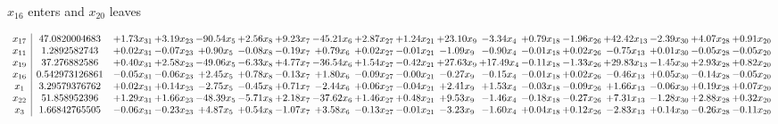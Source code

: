 \documentclass[9pt]{article}
\begin{document}
 $ x_{16} $ enters and $ x_{20} $ leaves 

 \[\begin{array}{c| c c@{\hskip 2pt} c@{\hskip 2pt} c@{\hskip 2pt} c@{\hskip 2pt} c@{\hskip 2pt} c@{\hskip 2pt} c@{\hskip 2pt} c@{\hskip 2pt} c@{\hskip 2pt} c@{\hskip 2pt} c@{\hskip 2pt} c@{\hskip 2pt} c@{\hskip 2pt} c@{\hskip 2pt} c@{\hskip 2pt} c@{\hskip 2pt} }
 x_{17}   &  47.0820004683 & +  1.73 x_{31} & +  3.19 x_{23} & -90.54 x_{5} & +  2.56 x_{8} & +  9.23 x_{7} & -45.21 x_{6} & +  2.87 x_{27} & +  1.24 x_{21} & + 23.10 x_{9} & -3.34 x_{4} & +  0.79 x_{18} & -1.96 x_{26} & + 42.42 x_{13} & -2.39 x_{30} & +  4.07 x_{28} & +  0.91 x_{20}\\
 x_{11}   &  1.2892582743 & +  0.02 x_{31} & -0.07 x_{23} & +  0.90 x_{5} & -0.08 x_{8} & -0.19 x_{7} & +  0.79 x_{6} & +  0.02 x_{27} & -0.01 x_{21} & -1.09 x_{9} & -0.90 x_{4} & -0.01 x_{18} & +  0.02 x_{26} & -0.75 x_{13} & +  0.01 x_{30} & -0.05 x_{28} & -0.05 x_{20}\\
 x_{19}   &  37.276882586 & +  0.40 x_{31} & +  2.58 x_{23} & -49.06 x_{5} & -6.33 x_{8} & +  4.77 x_{7} & -36.54 x_{6} & +  1.54 x_{27} & -0.42 x_{21} & + 27.63 x_{9} & + 17.49 x_{4} & -0.11 x_{18} & -1.33 x_{26} & + 29.83 x_{13} & -1.45 x_{30} & +  2.93 x_{28} & +  0.82 x_{20}\\
 x_{16}   &  0.542973126861 & -0.05 x_{31} & -0.06 x_{23} & +  2.45 x_{5} & +  0.78 x_{8} & -0.13 x_{7} & +  1.80 x_{6} & -0.09 x_{27} & -0.00 x_{21} & -0.27 x_{9} & -0.15 x_{4} & -0.01 x_{18} & +  0.02 x_{26} & -0.46 x_{13} & +  0.05 x_{30} & -0.14 x_{28} & -0.05 x_{20}\\
 x_{1}   &  3.29579376762 & +  0.02 x_{31} & +  0.14 x_{23} & -2.75 x_{5} & -0.45 x_{8} & +  0.71 x_{7} & -2.44 x_{6} & +  0.06 x_{27} & -0.04 x_{21} & +  2.41 x_{9} & +  1.53 x_{4} & -0.03 x_{18} & -0.09 x_{26} & +  1.66 x_{13} & -0.06 x_{30} & +  0.19 x_{28} & +  0.07 x_{20}\\
 x_{22}   &  51.858952396 & +  1.29 x_{31} & +  1.66 x_{23} & -48.39 x_{5} & -5.71 x_{8} & +  2.18 x_{7} & -37.62 x_{6} & +  1.46 x_{27} & +  0.48 x_{21} & +  9.53 x_{9} & -1.46 x_{4} & -0.18 x_{18} & -0.27 x_{26} & +  7.31 x_{13} & -1.28 x_{30} & +  2.88 x_{28} & +  0.32 x_{20}\\
 x_{3}   &  1.66842765505 & -0.06 x_{31} & -0.23 x_{23} & +  4.87 x_{5} & +  0.54 x_{8} & -1.07 x_{7} & +  3.58 x_{6} & -0.13 x_{27} & -0.01 x_{21} & -3.23 x_{9} & -1.60 x_{4} & +  0.04 x_{18} & +  0.12 x_{26} & -2.83 x_{13} & +  0.14 x_{30} & -0.26 x_{28} & -0.11 x_{20}\\

\end{array}\]
\end{document}
